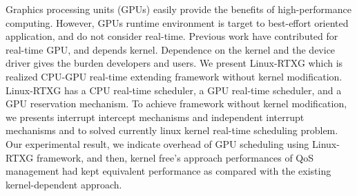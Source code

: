 Graphics processing units (GPUs) easily provide the benefits of high-performance computing.
However, GPUs runtime environment is target to best-effort oriented application, and do not consider real-time.
Previous work have contributed for real-time GPU, and depends kernel.
Dependence on the kernel and the device driver gives the burden developers and users.
We present Linux-RTXG which is realized CPU-GPU real-time extending framework without kernel modification.
Linux-RTXG has a CPU real-time scheduler, a GPU real-time scheduler, and a GPU reservation mechanism.
To achieve framework without kernel modification, 
we presents interrupt intercept mechanisms and independent interrupt mechanisms and to solved currently linux kernel real-time scheduling problem.
Our experimental result,
we indicate overhead of GPU scheduling using Linux-RTXG framework,
and then, kernel free's approach performances of QoS management had kept equivalent performance as compared with the existing kernel-dependent approach.
